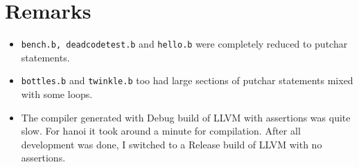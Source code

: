 \documentclass[11pt,answers]{exam}
\begin{document}
\section{Remarks}
\begin{itemize}
  \item \texttt{bench.b, deadcodetest.b} and \texttt{hello.b} were completely reduced to putchar statements.
  \item \texttt{bottles.b} and \texttt{twinkle.b} too had large sections of putchar statements mixed with some loops.
  \item  The compiler generated with Debug build of LLVM with assertions was quite slow. For hanoi it took around a minute for compilation. After all development was done, I switched to a Release build of LLVM with no assertions.
\end{itemize}
\end{document}
